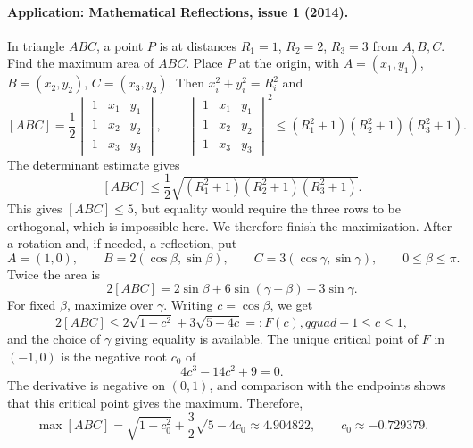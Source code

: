 \documentclass[11pt,a4paper]{article}
\begin{document}
\paragraph{Application: Mathematical Reflections, issue 1 (2014).}
In triangle $ABC$, a point $P$ is at distances $R_1=1$, $R_2=2$, $R_3=3$ from $A,B,C$.
Find the maximum area of $ABC$.
Place $P$ at the origin, with $A=(x_1,y_1)$, $B=(x_2,y_2)$, $C=(x_3,y_3)$.
Then $x_i^2+y_i^2=R_i^2$ and
\[
[ABC]=\frac12\begin{vmatrix}1&x_1&y_1\\1&x_2&y_2\\1&x_3&y_3\end{vmatrix},\qquad
\begin{vmatrix}1&x_1&y_1\\1&x_2&y_2\\1&x_3&y_3\end{vmatrix}^{\!2}
\leq(R_1^2+1)(R_2^2+1)(R_3^2+1).
\]
The determinant estimate gives
\[
[ABC]\leq\frac12\sqrt{(R_1^2+1)(R_2^2+1)(R_3^2+1)}.
\]
This gives $[ABC]\leq5$, but equality would require the three rows to be
orthogonal, which is impossible here. We therefore finish the maximization.
After a rotation and, if needed, a reflection, put
\[
A=(1,0),\qquad B=2(\cos\beta,\sin\beta),\qquad
C=3(\cos\gamma,\sin\gamma),\qquad 0\leq\beta\leq\pi.
\]
Twice the area is
\[
2[ABC]=2\sin\beta+6\sin(\gamma-\beta)-3\sin\gamma.
\]
For fixed $\beta$, maximize over $\gamma$. Writing $c=\cos\beta$, we get
\[
2[ABC]\leq2\sqrt{1-c^2}+3\sqrt{5-4c}=:F(c),qquad -1\leq c\leq1,
\]
and the choice of $\gamma$ giving equality is available. The unique critical
point of $F$ in $(-1,0)$ is the negative root $c_0$ of
\[
4c^3-14c^2+9=0.
\]
The derivative is negative on $(0,1)$, and comparison with the endpoints
shows that this critical point gives the maximum. Therefore,
\[
\max[ABC]=\sqrt{1-c_0^2}+\frac32\sqrt{5-4c_0}
\approx4.904822,
\qquad c_0\approx-0.729379.
\]

\end{document}
